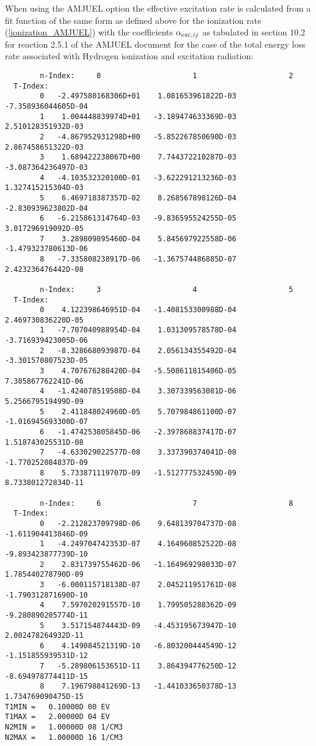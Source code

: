 \documentclass[amsmath,amssymb,a4]{revtex4-2}
\begin{document}
When using the AMJUEL option the effective excitation rate is calculated from a fit function of the same form as defined above for the ionization rate (\ref{ionization_AMJUEL}) with the coefficients $\alpha_{{\rm exc,} ij}$ as tabulated in section 10.2 for reaction 2.5.1 of the AMJUEL document for the case of the total energy loss rate associated with Hydrogen ionization and excitation radiation:
\begin{small}\begin{verbatim}
        n-Index:     0                     1                     2
  T-Index:
        0   -2.497580168306D+01    1.081653961822D-03   -7.358936044605D-04
        1    1.004448839974D+01   -3.189474633369D-03    2.510128351932D-03
        2   -4.867952931298D+00   -5.852267850690D-03    2.867458651322D-03
        3    1.689422238067D+00    7.744372210287D-03   -3.087364236497D-03
        4   -4.103532320100D-01   -3.622291213236D-03    1.327415215304D-03
        5    6.469718387357D-02    8.268567898126D-04   -2.830939623802D-04
        6   -6.215861314764D-03   -9.836595524255D-05    3.017296919092D-05
        7    3.289809895460D-04    5.845697922558D-06   -1.479323780613D-06
        8   -7.335808238917D-06   -1.367574486885D-07    2.423236476442D-08

        n-Index:     3                     4                     5
  T-Index:
        0    4.122398646951D-04   -1.408153300988D-04    2.469730836220D-05
        1   -7.707040988954D-04    1.031309578578D-04   -3.716939423005D-06
        2   -8.328668093987D-04    2.056134355492D-04   -3.301570807523D-05
        3    4.707676288420D-04   -5.508611815406D-05    7.305867762241D-06
        4   -1.424078519508D-04    3.307339563081D-06    5.256679519499D-09
        5    2.411848024960D-05    5.707984861100D-07   -1.016945693300D-07
        6   -1.474253805845D-06   -2.397868837417D-07    1.518743025531D-08
        7   -4.633029022577D-08    3.337390374041D-08   -1.770252084837D-09
        8    5.733871119707D-09   -1.512777532459D-09    8.733801272834D-11

        n-Index:     6                     7                     8
  T-Index:
        0   -2.212823709798D-06    9.648139704737D-08   -1.611904413846D-09
        1   -4.249704742353D-07    4.164960852522D-08   -9.893423877739D-10
        2    2.831739755462D-06   -1.164969298033D-07    1.785440278790D-09
        3   -6.000115718138D-07    2.045211951761D-08   -1.790312871690D-10
        4    7.597020291557D-10    1.799505288362D-09   -9.280890205774D-11
        5    3.517154874443D-09   -4.453195673947D-10    2.002478264932D-11
        6    4.149084521319D-10   -6.803200444549D-12   -1.151855939531D-12
        7   -5.289806153651D-11    3.864394776250D-12   -8.694978774411D-15
        8    7.196798841269D-13   -1.441033650378D-13    1.734769090475D-15
T1MIN =   0.10000D 00 EV
T1MAX =   2.00000D 04 EV
N2MIN =   1.00000D 08 1/CM3
N2MAX =   1.00000D 16 1/CM3
\end{verbatim}\end{small}
\end{document}
